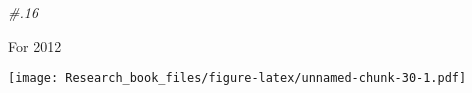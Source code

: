 \documentclass[]{book}
\newenvironment{Shaded}{\begin{snugshade}}{\end{snugshade}}
\newcommand{\KeywordTok}[1]{\textcolor[rgb]{0.13,0.29,0.53}{\textbf{#1}}}
\newcommand{\DataTypeTok}[1]{\textcolor[rgb]{0.13,0.29,0.53}{#1}}
\newcommand{\DecValTok}[1]{\textcolor[rgb]{0.00,0.00,0.81}{#1}}
\newcommand{\FloatTok}[1]{\textcolor[rgb]{0.00,0.00,0.81}{#1}}
\newcommand{\StringTok}[1]{\textcolor[rgb]{0.31,0.60,0.02}{#1}}
\newcommand{\CommentTok}[1]{\textcolor[rgb]{0.56,0.35,0.01}{\textit{#1}}}
\newcommand{\OperatorTok}[1]{\textcolor[rgb]{0.81,0.36,0.00}{\textbf{#1}}}
\newcommand{\NormalTok}[1]{#1}
\theoremstyle{definition}
\theoremstyle{definition}
\theoremstyle{definition}
\theoremstyle{remark}
\begin{document}
\begin{Shaded}
\begin{Highlighting}[]
\CommentTok{#.16}
\end{Highlighting}
\end{Shaded}

For 2012

\begin{Shaded}
\end{Shaded}

\texttt{[image: Research\_book\_files/figure-latex/unnamed-chunk-30-1.pdf]}
\end{document}
